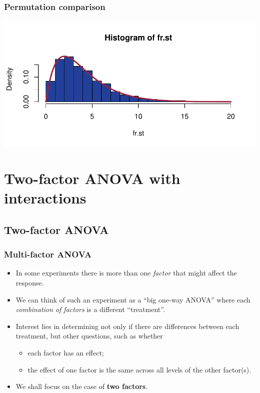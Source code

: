 \documentclass[a4paper]{article}\usepackage[]{graphicx}\usepackage[]{xcolor}
\makeatletter
\def\maxwidth{ %
  \ifdim\Gin@nat@width>\linewidth
    \linewidth
  \else
    \Gin@nat@width
  \fi
}
\makeatother
\begin{document}
\subsubsection{Permutation comparison}
\begin{Schunk}


{\centering \includegraphics[width=\maxwidth]{figure/listings-unnamed-chunk-301-1} 

}

\end{Schunk}
\newpage

\section{Two-factor ANOVA with interactions}\label{sec:25}
\subsection{Two-factor ANOVA}
\subsubsection{Multi-factor ANOVA}
\begin{itemize}
	\item In some experiments there is more than one \textit{factor} that might affect the response.
	\item We can think of such an experiment as a ``big one-way ANOVA'' where each \textit{combination of factors} is a different ``treatment''.
	\item Interest lies in determining not only if there are differences between each treatment, but other questions, such as whether
	\begin{itemize}
		\item each factor has an effect;
		\item the effect of one factor is the same across all levels of the other factor(s).
	\end{itemize}
	\item We shall focus on the case of \textbf{two factors}.
\end{itemize}
\end{document}
